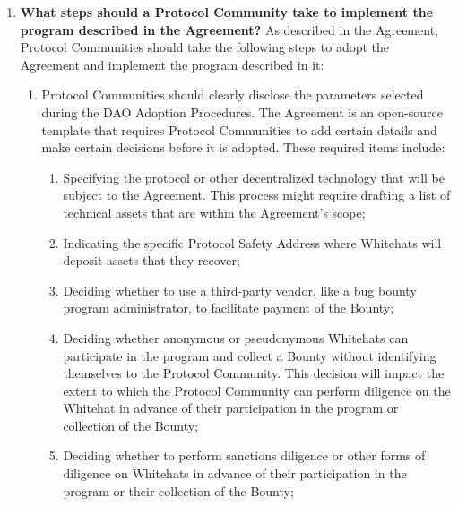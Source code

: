 \begin{enumerate}
    \item \textbf{What steps should a Protocol Community take to implement the program described in the Agreement?} As described in the Agreement, Protocol Communities should take the following steps to adopt the Agreement and implement the program described in it:

          \begin{enumerate}[label=\alph*.]
              \item Protocol Communities should clearly disclose the parameters selected during the DAO Adoption Procedures. The Agreement is an open-source template that requires Protocol Communities to add certain details and make certain decisions before it is adopted. These required items include:

                    \begin{enumerate}[label=\roman*.]
                        \item Specifying the protocol or other decentralized technology that will be subject to the Agreement. This process might require drafting a list of technical assets that are within the Agreement's scope;

                        \item Indicating the specific Protocol Safety Address where Whitehats will deposit assets that they recover;

                        \item Deciding whether to use a third-party vendor, like a bug bounty program administrator, to facilitate payment of the Bounty;

                        \item Deciding whether anonymous or pseudonymous Whitehats can participate in the program and collect a Bounty without identifying themselves to the Protocol Community. This decision will impact the extent to which the Protocol Community can perform diligence on the Whitehat in advance of their participation in the program or collection of the Bounty;

                        \item Deciding whether to perform sanctions diligence or other forms of diligence on Whitehats in advance of their participation in the program or their collection of the Bounty;


\end{enumerate}
\end{enumerate}
\end{enumerate}
